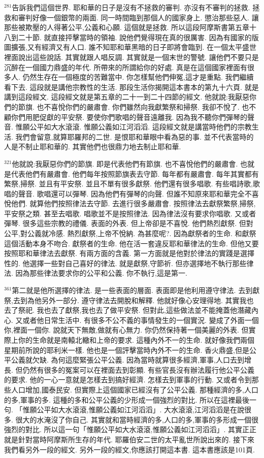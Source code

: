 \documentclass{book}
\begin{document}
$^{281}$告訴我們這個世界.
耶和華的日子是沒有不拯救的審判.
亦沒有不審判的拯救.
拯救和審判好像一個銀幣的兩面.
同一時間臨到那個人的國家身上.
懲治那些惡人.
讓那些被欺壓的人得著公平,公義和心願.
這個就是拯救.
所以這段阿摩斯書第五章十八到二十節.
就直接抨擊當時的領袖.
說他們覺得現在真的很厲害.
因為有國家的版圖擴張,又有經濟又有人口.
誰不知耶和華黑暗的日子即將會臨到.
在一個太平盛世裡面說出這些說話.
其實就跟人唱反調.
其實就是一個末世的警號.
讓他們不要只是沉醉在一個國力鼎盛的年代.
所帶來的所謂給你的好處.
真是在這個國家裡面有很多人.
仍然生存在一個極度的苦難當中.
你怎樣幫他們伸冤,這才是重點.
我們繼續看下去.
這段就是講他宗教性的生活.
那段生活你揭開這本書本的第九十六頁.
就是講到這段經文.
這段經文就是第五章的二十一到二十四節的經文.
他就說:我厭惡你們的節旗.
也不喜悅你們的嚴肅會.
你們雖然向我獻繁祭和掃祭.
我卻不悅了.
也不顧你們用肥促獻的平安祭.
要使你們歌唱的聲音遠離我.
因為我不聽你們彈琴的聲音.
惟願公平如大水滾滾.
惟願公義如江河滔滔.
這段經文就是講當時他們的宗教生活.
我們會留意,就算耶羅邦的二世.
是恨耶和華眼中看為惡的事.
並不代表當時的人是不制止耶和華的.
其實他們也很鼎力地去制止耶和華.

$^{321}$他就說:我厭惡你們的節旗.
即是代表他們有節旗.
也不喜悅他們的嚴肅會.
也就是代表他們有嚴肅會.
他們每年按照節旗表去守節.
每年都有嚴肅會.
每年其實都有繁祭,掃祭.
並且有平安祭.
並且不單有很多獻祭.
他們還有很多唱歌.
有些唱詩歌,歌唱的聲音.
歌唱還可以彈琴.
因為他們有彈琴的向聲.
但誰不知原來耶和華完全不喜悅他們.
就算他們按照律法去守節.
去進行很多嚴肅會.
按照律法去獻祭繁祭,掃祭,平安祭之類.
甚至去唱歌.
唱歌並不是按照律法.
因為律法沒有要求你唱歌.
又或者彈琴.
很多這些宗教的禮儀.
表面的外表.
但上帝卻是不喜悅.
他們熱烈獻祭.
但對公平,對公義就冷感.
熱烈獻祭,上帝不悅納.
為甚麼呢?.
因為獻祭者的生命.
和獻祭這個活動本身不吻合.
獻祭者的生命.
他在活一套違反耶和華律法的生命.
但他又要按照耶和華律法去獻祭.
有兩方面的含義.
第一方面就是他對於律法的實踐是選擇性的.
他選擇一些對自己喜好的律法.
就是獻祭,守節祈.
但亦選擇地不執行那些律法.
因為那些律法要求你的公平和公義.
你不執行,這是第一.

$^{361}$第二就是他所選擇的律法.
是一些表面的層面.
表面即是他利用遵守律法.
去到獻祭,去到為他另外一部分.
遵守律法去開脫和解釋.
他就好像心安理得地.
其實我也去了祭祀.
我也去了獻祭,我也去了做平安祭.
但對此,這些做法並不能掩蓋他潛藏內心.
又或者他日常生活中.
有很多不公不義的事情發生的一個實況.
變成了外面一個你,裡面一個你.
說就天下無敵,做就有心無力.
你仍然保持著一個美麗的外表.
但實際上你的生命就是南轅北轍和上帝的要求.
這種內外不一的生命.
就好像我們兩個星期前所說的耶利米一樣.
他也是一個評擊當時內外不一的生命.
香火鼎盛,但是公平公義就欠缺.
為何這麼緊張公平公義.
因為當時就算很多經濟,軍事,人口去到增長.
但仍然有很多的冤案可以在裡面去到彰顯.
有些官長沒有辦法履行他公平公義的要求.
他的一心一意就是怎樣去到搞好經濟.
怎樣去到軍事的行動.
又或者令到那些人口增加,國泰民安.
但實際上這個國家已經沒有了公平公義.
那種經濟的多,人口的多,軍事的多.
這種的多和公平公義的少形成一個強烈的對比.
所以在這裡最後一句.
「惟願公平如大水滾滾,惟願公義如江河滔滔」.
大水滾滾,江河滔滔是在說很多.
很大的水淹沒了你自己.
其實就和當時經濟的多,人口的多,軍事的多形成一個很強烈的對比.
所以這一句「惟願公平如大水滾滾,惟願公義如江河滔滔」.
其實正正就是針對當時阿摩斯所生存的年代.
耶羅伯安二世的太平亂世所說出來的.
接下來我們看另外一段的經文.
另外一段的經文,你應該打開這本書.
這本書應該是101頁.
\end{document}
